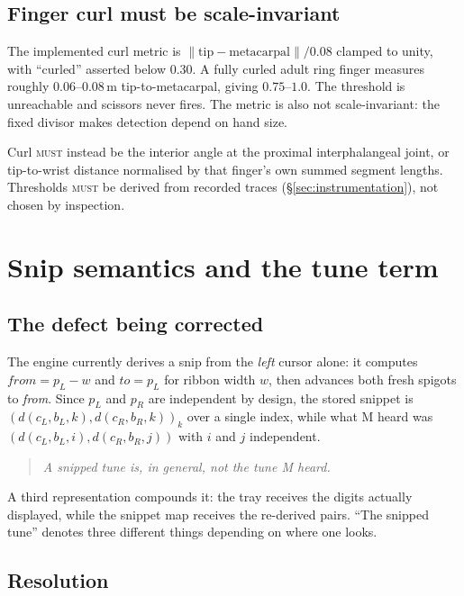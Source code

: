 \documentclass[11pt,a4paper]{article}
\newcommand{\MUST}{\textsc{must}}
\theoremstyle{definition}
\theoremstyle{plain}
\theoremstyle{remark}
\begin{document}
\subsection{Finger curl must be scale-invariant}

The implemented curl metric is $\lVert\text{tip}-\text{metacarpal}\rVert/0.08$ clamped to unity,
with ``curled'' asserted below $0.30$. A fully curled adult ring finger measures roughly
$0.06$--$0.08$\,m tip-to-metacarpal, giving $0.75$--$1.0$. The threshold is unreachable and
scissors never fires. The metric is also not scale-invariant: the fixed divisor makes detection
depend on hand size.

Curl \MUST{} instead be the interior angle at the proximal interphalangeal joint, or tip-to-wrist
distance normalised by that finger's own summed segment lengths. Thresholds \MUST{} be derived from
recorded traces (\S\ref{sec:instrumentation}), not chosen by inspection.


\section{Snip semantics and the tune term}
\label{sec:snip}

\subsection{The defect being corrected}

The engine currently derives a snip from the \emph{left} cursor alone: it computes
$\textit{from}=p_L-w$ and $\textit{to}=p_L$ for ribbon width $w$, then advances both fresh spigots
to \textit{from}. Since $p_L$ and $p_R$ are independent by design, the stored snippet is
$(d(c_L,b_L,k), d(c_R,b_R,k))_{k}$ over a single index, while what M heard was
$(d(c_L,b_L,i), d(c_R,b_R,j))$ with $i$ and $j$ independent.

\begin{quote}\itshape
A snipped tune is, in general, not the tune M heard.
\end{quote}

A third representation compounds it: the tray receives the digits actually displayed, while the
snippet map receives the re-derived pairs. ``The snipped tune'' denotes three different things
depending on where one looks.

\subsection{Resolution}
\end{document}
